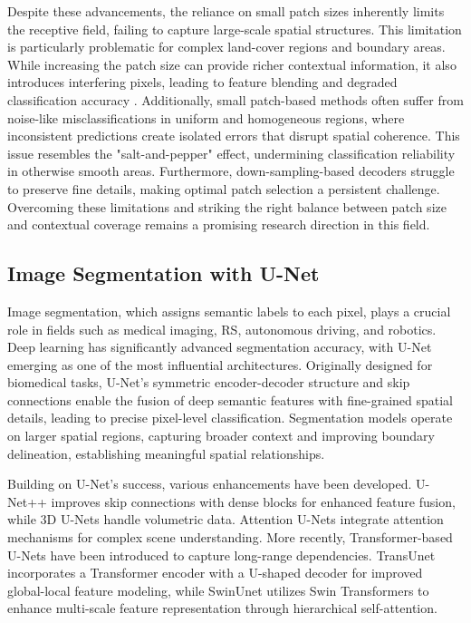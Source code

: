 Despite these advancements, the reliance on small patch sizes inherently limits the receptive field, failing to capture large-scale spatial structures. This limitation is particularly problematic for complex land-cover regions and boundary areas. While increasing the patch size can provide richer contextual information, it also introduces interfering pixels, leading to feature blending and degraded classification accuracy \cite{seg_hsi}. Additionally, small patch-based methods often suffer from noise-like misclassifications in uniform and homogeneous regions, where inconsistent predictions create isolated errors that disrupt spatial coherence. This issue resembles the "salt-and-pepper" effect, undermining classification reliability in otherwise smooth areas. Furthermore, down-sampling-based decoders struggle to preserve fine details, making optimal patch selection a persistent challenge. Overcoming these limitations and striking the right balance between patch size and contextual coverage remains a promising research direction in this field.


\subsection{Image Segmentation with U-Net}
Image segmentation, which assigns semantic labels to each pixel, plays a crucial role in fields such as medical imaging, RS, autonomous driving, and robotics. Deep learning has significantly advanced segmentation accuracy, with U-Net \cite{unet} emerging as one of the most influential architectures. Originally designed for biomedical tasks, U-Net’s symmetric encoder-decoder structure and skip connections enable the fusion of deep semantic features with fine-grained spatial details, leading to precise pixel-level classification. Segmentation models operate on larger spatial regions, capturing broader context and improving boundary delineation, establishing meaningful spatial relationships.

Building on U-Net’s success, various enhancements have been developed. U-Net++ \cite{unet++} improves skip connections with dense blocks for enhanced feature fusion, while 3D U-Nets \cite{3dunet} handle volumetric data. Attention U-Nets \cite{attention-unet} integrate attention mechanisms for complex scene understanding. More recently, Transformer-based U-Nets have been introduced to capture long-range dependencies. TransUnet \cite{transunet} incorporates a Transformer encoder with a U-shaped decoder for improved global-local feature modeling, while SwinUnet \cite{swinunet} utilizes Swin Transformers \cite{swintrans} to enhance multi-scale feature representation through hierarchical self-attention.

